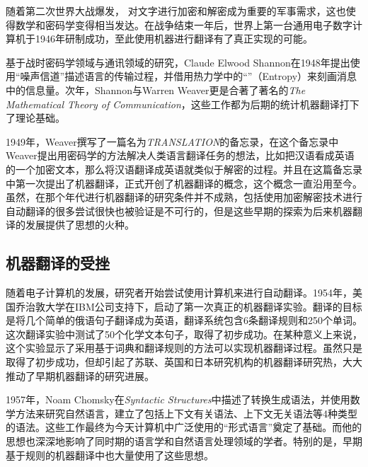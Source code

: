 \parinterval 随着第二次世界大战爆发， 对文字进行加密和解密成为重要的军事需求，这也使得数学和密码学变得相当发达。在战争结束一年后，世界上第一台通用电子数字计算机于1946年研制成功，至此使用机器进行翻译有了真正实现的可能。

\parinterval 基于战时密码学领域与通讯领域的研究，Claude Elwood Shannon在1948年提出使用“噪声信道”描述语言的传输过程，并借用热力学中的“{\small{}}”（Entropy）来刻画消息中的信息量。次年，Shannon与Warren Weaver更是合著了著名的\emph{The Mathematical Theory of Communication}，这些工作都为后期的统计机器翻译打下了理论基础。

\parinterval 1949年，Weaver撰写了一篇名为\emph{TRANSLATION}的备忘录，在这个备忘录中Weaver提出用密码学的方法解决人类语言翻译任务的想法，比如把汉语看成英语的一个加密文本，那么将汉语翻译成英语就类似于解密的过程。并且在这篇备忘录中第一次提出了机器翻译，正式开创了机器翻译的概念，这个概念一直沿用至今。虽然，在那个年代进行机器翻译的研究条件并不成熟，包括使用加密解密技术进行自动翻译的很多尝试很快也被验证是不可行的，但是这些早期的探索为后来机器翻译的发展提供了思想的火种。


\subsection{机器翻译的受挫}

\parinterval 随着电子计算机的发展，研究者开始尝试使用计算机来进行自动翻译。1954年，美国乔治敦大学在IBM公司支持下，启动了第一次真正的机器翻译实验。翻译的目标是将几个简单的俄语句子翻译成为英语，翻译系统包含6条翻译规则和250个单词。这次翻译实验中测试了50个化学文本句子，取得了初步成功。在某种意义上来说，这个实验显示了采用基于词典和翻译规则的方法可以实现机器翻译过程。虽然只是取得了初步成功，但却引起了苏联、英国和日本研究机构的机器翻译研究热，大大推动了早期机器翻译的研究进展。

\parinterval 1957年，Noam Chomsky在\emph{Syntactic Structures}中描述了转换生成语法，并使用数学方法来研究自然语言，建立了包括上下文有关语法、上下文无关语法等4种类型的语法。这些工作最终为今天计算机中广泛使用的“形式语言”奠定了基础。而他的思想也深深地影响了同时期的语言学和自然语言处理领域的学者。特别的是，早期基于规则的机器翻译中也大量使用了这些思想。

